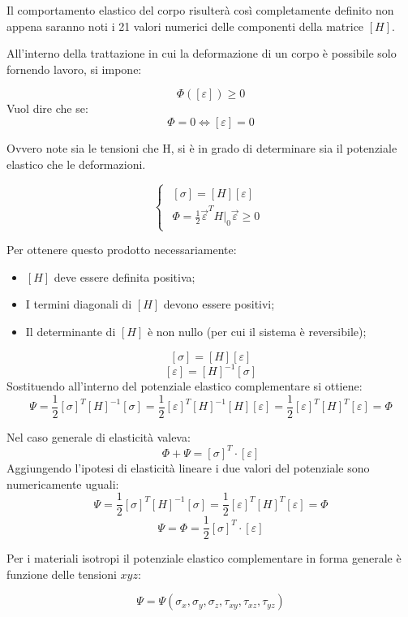 \documentclass{article}
\begin{document}
\begin{adjustwidth}{2in}{}
	Il comportamento elastico del corpo risulterà così completamente definito non appena saranno noti i
	21 valori numerici delle componenti della matrice $ [H] $. \newline
	
	All'interno della trattazione in cui la deformazione di un corpo è possibile solo fornendo lavoro, si impone: 
	
	\[
	\Phi([\varepsilon]) \geq 0 
	\]
	Vuol dire che se:
	\[
	\Phi = 0 \Leftrightarrow [\varepsilon] = 0
	\]
	
	Ovvero note sia le tensioni che H, si è in grado di determinare sia il potenziale elastico che le deformazioni.
	
	\[
	\begin{cases}
\begin{aligned}
[\sigma] = [H][\varepsilon] \\
\Phi = \frac{1}{2} \vec{\varepsilon}^T H|_0 \vec{\varepsilon} \geq 0
\end{aligned}
	\end{cases}
	\]
	
	Per ottenere questo prodotto necessariamente: 
	\begin{itemize}
\item $ [H] $ deve essere definita positiva;
\item I termini diagonali di $ [H] $ devono essere positivi;
\item Il determinante di $ [H] $ è non nullo (per cui il sistema è reversibile);
	\end{itemize}
	
	\[
	[\sigma] = [H][\varepsilon]
	\]
	\[
	[\varepsilon] = [H]^{-1}[\sigma]
	\]
	Sostituendo all'interno del potenziale elastico complementare si ottiene:
	\[
	\Psi = \frac{1}{2} [\sigma]^T[H]^{-1}[\sigma] = \frac{1}{2}[\varepsilon]^T[H]^{-1}[H][\varepsilon] = \frac{1}{2}[\varepsilon]^T[H]^T[\varepsilon] = \Phi
	\]
	
	Nel caso generale di elasticità valeva: 
	\[
	\Phi + \Psi = [\sigma]^T \cdot [\varepsilon]
	\]
	Aggiungendo l’ipotesi di elasticità lineare i due valori del potenziale sono
	numericamente uguali:
	\[
	\Psi = \frac{1}{2} [\sigma]^T[H]^{-1}[\sigma] = \frac{1}{2}[\varepsilon]^T[H]^T[\varepsilon] = \Phi
	\]
	\[
	\Psi = \Phi = \frac{1}{2} [\sigma]^T \cdot [\varepsilon]
	\]
	 
	Per i materiali isotropi il potenziale elastico complementare in forma generale è funzione
	delle tensioni $ xyz $:
	
	\[
	\Psi = \Psi(\sigma_x, \sigma_y, \sigma_z, \tau_{xy}, \tau_{xz}, \tau_{yz})
	\]
	

\end{adjustwidth}
\end{document}
